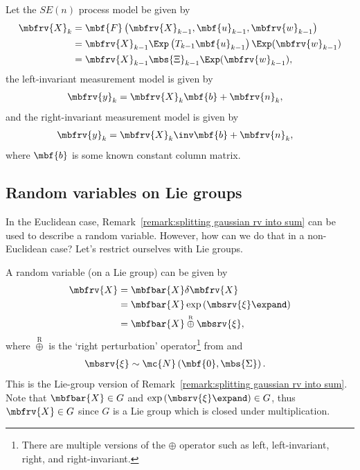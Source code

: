 \documentclass[nobib, nofonts, notoc, justified]{tufte-handout}
\newcommand{\rplus}{\overset{{\scriptscriptstyle\mathrm{R}}}{\oplus}}
\begin{document}
  Let the $SE(n)$ process model be given by
  \begin{align}
    \label{eq:InEKF: process model}
    \mbfrv{X}_{k} &= \mbf{F}\left( \mbfrv{X}_{k-1}, \mbf{u}_{k-1}, \mbfrv{w}_{k-1} \right)\\
    &= \mbfrv{X}_{k-1}\Exp\left( T_{k-1}\mbf{u}_{k-1} \right)\Exp(\mbfrv{w}_{k-1})\\
    \label{eq:InEKF: SE3 process model}
    &= \mbfrv{X}_{k-1}\mbs{\Xi}_{k-1}\Exp(\mbfrv{w}_{k-1}),
  \end{align}
  the left-invariant measurement model is given by
  \begin{align}
    \label{eq:InEKF: LI meas. model}
    \mbfrv{y}_{k} &= \mbfrv{X}_{k}\mbf{b} + \mbfrv{n}_{k},
  \end{align}
  and the right-invariant measurement model is given by
  \begin{align}
    \label{eq:InEKF: RI meas. model}
    \mbfrv{y}_{k} &= \mbfrv{X}_{k}\inv\mbf{b} + \mbfrv{n}_{k},
  \end{align}
  where $\mbf{b}$ is some known constant column matrix.

  \subsection{Random variables on Lie groups}
  \label{sec:Random variables on Lie groups}
  In the Euclidean case, Remark~\ref{remark:splitting gaussian rv into sum} can be used to describe a random variable. However, how can we do that in a non-Euclidean case? Let's restrict ourselves with Lie groups. 
   
  
  A random variable (on a Lie group) can be given by
  \begin{align}
    \mbfrv{X} &= \mbfbar{X}\delta\mbfrv{X}\\
    &= \mbfbar{X}\exp\left( \mbsrv{\xi}\expand \right)\\
    &= \mbfbar{X} \rplus \mbsrv{\xi},
  \end{align}
  where $\rplus$ is the `right perturbation' operator\footnote{There are multiple versions of the $\oplus$ operator such as left, left-invariant, right, and right-invariant.} from
   \cite{Sola_Micro_2020} and
  \begin{align}
    \mbsrv{\xi} &\sim \mc{N}\left( \mbf{0}, \mbs{\Sigma} \right).
  \end{align}
  This is the Lie-group version of Remark~\ref{remark:splitting gaussian rv into sum}. Note that $\mbfbar{X}\in G$ and $\exp\left( \mbsrv{\xi}\expand \right)\in G$, thus $\mbfrv{X}\in G$ since $G$ is a Lie group which is closed under multiplication.
\end{document}
